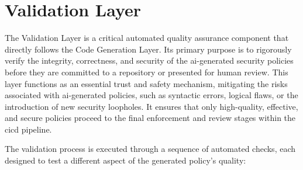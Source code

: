 
\section{Validation Layer}
\label{sec:validation-layer}

The Validation Layer is a critical automated quality assurance component that directly follows the Code Generation Layer. Its primary purpose is to rigorously verify the integrity, correctness, and security of the \gls{ai}-generated security policies before they are committed to a repository or presented for human review. This layer functions as an essential trust and safety mechanism, mitigating the risks associated with \gls{ai}-generated policies, such as syntactic errors, logical flaws, or the introduction of new security loopholes. It ensures that only high-quality, effective, and secure policies proceed to the final enforcement and review stages within the \gls{cicd} pipeline.

The validation process is executed through a sequence of automated checks, each designed to test a different aspect of the generated policy's quality:

